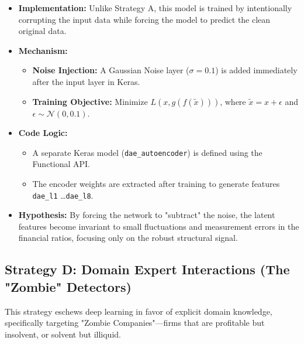 \documentclass{report}\usepackage[]{graphicx}\usepackage[]{xcolor}
\begin{document}
\begin{itemize}
    \item \textbf{Implementation:} Unlike Strategy A, this model is trained by intentionally corrupting the input data while forcing the model to predict the clean original data.
    \item \textbf{Mechanism:}
    \begin{itemize}
        \item \textbf{Noise Injection:} A Gaussian Noise layer ($\sigma = 0.1$) is added immediately after the input layer in Keras.
        \item \textbf{Training Objective:} Minimize $L(x, g(f(\tilde{x})))$, where $\tilde{x} = x + \epsilon$ and $\epsilon \sim \mathcal{N}(0, 0.1)$.
    \end{itemize}
    \item \textbf{Code Logic:}
    \begin{itemize}
        \item A separate Keras model (\texttt{dae\_autoencoder}) is defined using the Functional API.
        \item The encoder weights are extracted after training to generate features \texttt{dae\_l1} \dots \texttt{dae\_l8}.
    \end{itemize}
    \item \textbf{Hypothesis:} By forcing the network to "subtract" the noise, the latent features become invariant to small fluctuations and measurement errors in the financial ratios, focusing only on the robust structural signal.
\end{itemize}

\subsection{Strategy D: Domain Expert Interactions (The "Zombie" Detectors)}
This strategy eschews deep learning in favor of explicit domain knowledge, specifically targeting "Zombie Companies"—firms that are profitable but insolvent, or solvent but illiquid.
\end{document}
